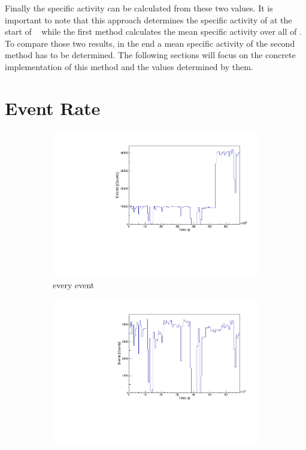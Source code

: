 Finally the specific activity can be calculated from these two values.
It is important to note that this approach determines the specific activity of \Kr at the start of \PII~ while the first method calculates the mean specific activity over all of \PII.
To compare those two results, in the end a mean specific activity of the second method has to be determined.
The following sections will focus on the concrete implementation of this method and the values determined by them.
\\

\section{Event Rate}
\label{sec:EventAct}

\begin{figure}[t!]
	\centering
	\begin{subfigure}{.5\textwidth}
		\centering
		\includegraphics[width=\textwidth]{./Bilder/ZeitverlaufALLE.pdf}
		\caption{every event}
		\label{fig:ZeitAll}
	\end{subfigure}%
	\begin{subfigure}{.5\textwidth}
		\centering
		\includegraphics[width=\textwidth]{./Bilder/ZeitverlaufLimits.pdf}

\end{subfigure}
\end{figure}
